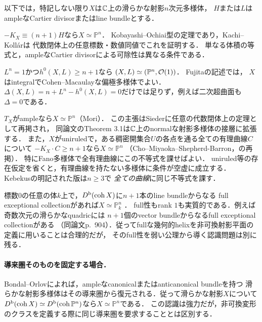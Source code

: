 \documentclass[11pt,a4paper]{ltjsarticle}
\begin{document}
以下では，特記しない限り$X$は$\mathbb C$上の滑らかな射影$n$次元多様体，
$H$または$L$はampleなCartier divisorまたはline bundleとする．
\begin{description}[style=nextline]
\item[最大指数による認識]
$-K_X\equiv(n+1)H$なら$X\simeq\mathbb P^n$．
Kobayashi--Ochiai型の定理であり，Kachi--Koll\'ar\cite[Corollary 2(1)]{KachiKollar}は
代数閉体上の任意標数・数値同値でこれを証明する．
単なる体積の等式と，ampleなCartier divisorによる可除性は異なる条件である．
\item[次数1の偏極による認識]
$L^n=1$かつ$h^0(X,L)\geq n+1$なら
$(X,L)\simeq(\mathbb P^n,\mathcal O(1))$．
Fujita\cite[Chapter I, Theorem (1.1)]{TFujitaPolarized}の記述では，
$X$はintegralでCohen--Macaulayな偏極多様体でよい．
$\Delta(X,L)=n+L^n-h^0(X,L)=0$だけでは足りず，例えば二次超曲面も$\Delta=0$である．
\item[接束・有理曲線による認識]
$T_X$がampleなら$X\simeq\mathbb P^n$（Mori）．
この主張はSieder\cite[p.~1]{SiederTangent}に任意の代数閉体上の定理として再掲され，
同論文のTheorem 3.1は$\mathbb C$上のnormalな射影多様体の接層に拡張する．
また，$X$がuniruledで，ある稠密開集合$U$の各点を通る全ての有理曲線$C$について
$-K_X\cdot C\geq n+1$なら$X\simeq\mathbb P^n$
（Cho--Miyaoka--Shepherd-Barron，\cite[Theorem 2.6]{SiederTangent}の再掲）．
特にFano多様体で全有理曲線にこの不等式を課せばよい．
uniruled等の存在仮定を省くと，有理曲線を持たない多様体に条件が空虚に成立する．
Kebekus\cite[Theorem 1.1]{KebekusProjective}の明記された版は$n\geq3$で
\emph{全ての曲線}に同じ不等式を課す．
\item[導来圏による認識]
標数$0$の任意の体$k$上で，$D^{\mathrm b}(\operatorname{coh} X)$に$n+1$本のline bundleからなる
full exceptional collectionがあれば$X\simeq\mathbb P^n_k$
\cite[Theorem 1.2, pp.~904--905]{VialExceptional}．
full性もrank $1$も実質的である．例えば奇数次元の滑らかなquadricには
$n+1$個のvector bundleからなるfull exceptional collectionがある
（同論文p.~904）．従ってfullな幾何的helixを非可換射影平面の定義に用いることは合理的だが，
そのfull性を弱い公理から導く認識問題は別に残る．
\end{description}

\paragraph{導来圏そのものを固定する場合．}
Bondal--Orlov\cite[Theorem 2.5]{BondalOrlovReconstruction}によれば，ampleなcanonicalまたはanticanonical bundleを持つ
滑らかな射影多様体はその導来圏から復元される．従って滑らかな射影$X$について
$D^{\mathrm b}(\operatorname{coh} X)\simeq D^{\mathrm b}(\operatorname{coh}\mathbb P^n)$なら$X\simeq\mathbb P^n$である．
この認識は強力だが，非可換変形のクラスを定義する際に同じ導来圏を要求することとは区別する．
\end{document}
